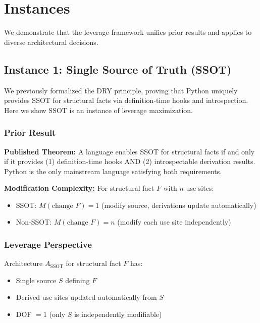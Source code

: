\section{Instances}\label{instances}

We demonstrate that the leverage framework unifies prior results and applies to diverse architectural decisions.

\subsection{Instance 1: Single Source of Truth (SSOT)}

We previously formalized the DRY principle, proving that Python uniquely provides SSOT for structural facts via definition-time hooks and introspection. Here we show SSOT is an instance of leverage maximization.

\subsubsection{Prior Result}

\textbf{Published Theorem:} A language enables SSOT for structural facts if and only if it provides (1) definition-time hooks AND (2) introspectable derivation results. Python is the only mainstream language satisfying both requirements.

\textbf{Modification Complexity:} For structural fact $F$ with $n$ use sites:
\begin{itemize}
\item SSOT: $M(\text{change } F) = 1$ (modify source, derivations update automatically)
\item Non-SSOT: $M(\text{change } F) = n$ (modify each use site independently)
\end{itemize}

\subsubsection{Leverage Perspective}

\begin{definition}
Architecture $A_{\text{SSOT}}$ for structural fact $F$ has:
\begin{itemize}
\item Single source $S$ defining $F$
\item Derived use sites updated automatically from $S$
\item DOF $= 1$ (only $S$ is independently modifiable)
\end{itemize}
\end{definition}

